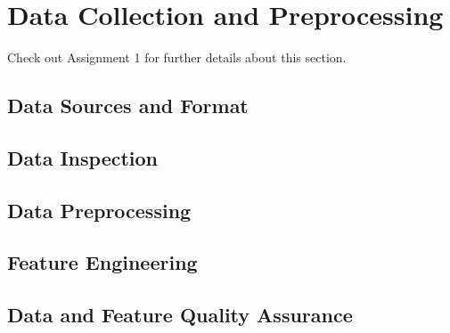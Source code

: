 \section{Data Collection and Preprocessing}
Check out Assignment 1 for further details about this section.

\subsection{Data Sources and Format}

\subsection{Data Inspection}

\subsection{Data Preprocessing}

\subsection{Feature Engineering}

\subsection{Data and Feature Quality Assurance}
